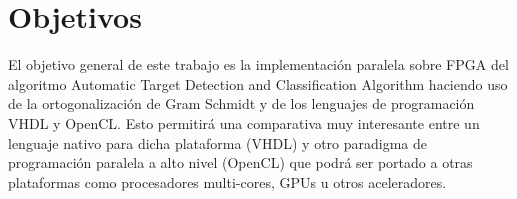 
\section{Objetivos}

El objetivo general de este trabajo es la implementación paralela sobre FPGA del algoritmo Automatic Target Detection and Classification Algorithm \cite{ATDCA,298007} haciendo uso de la ortogonalización de Gram Schmidt y de los lenguajes de programación VHDL y OpenCL. Esto permitirá una comparativa muy interesante entre un lenguaje nativo para dicha plataforma (VHDL) y otro paradigma de programación paralela a alto nivel (OpenCL) que podrá ser portado a otras plataformas como procesadores multi-cores, GPUs u otros aceleradores.

